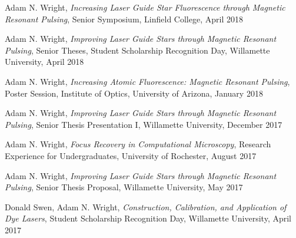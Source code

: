 \documentclass[12pt]{report}
\begin{document}
\begin{description}
\item Adam N. Wright, \textit{Increasing Laser Guide Star Fluorescence through Magnetic Resonant Pulsing}, Senior Symposium, Linfield College, April 2018\\
	
\item Adam N. Wright, \textit{Improving Laser Guide Stars through Magnetic Resonant Pulsing}, Senior Theses, Student Scholarship Recognition Day, Willamette University, April 2018\\

\item Adam N. Wright, \textit{Increasing Atomic Fluorescence: Magnetic Resonant Pulsing}, Poster Session, Institute of Optics, University of Arizona, January 2018\\
	
\item Adam N. Wright, \textit{Improving Laser Guide Stars through Magnetic Resonant Pulsing}, Senior Thesis Presentation I, Willamette University, December 2017\\

\item Adam N. Wright, \textit{Focus Recovery in Computational Microscopy}, Research Experience for Undergraduates, University of Rochester, August 2017\\

\item Adam N. Wright, \textit{Improving Laser Guide Stars through Magnetic Resonant Pulsing}, Senior Thesis Proposal, Willamette University, May 2017\\

\item Donald Swen, Adam N. Wright, \textit{Construction, Calibration, and Application of Dye Lasers}, Student Scholarship Recognition Day, Willamette University, April 2017\\


\end{description}
\end{document}
